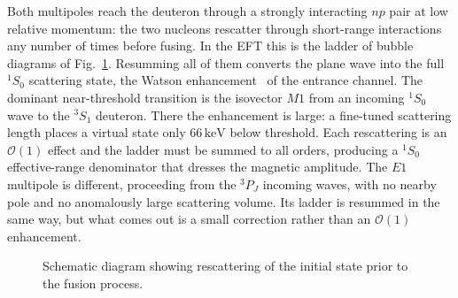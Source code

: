 \documentclass[
  aps,prd,twocolumn,nofootinbib,superscriptaddress,
  longbibliography,floatfix,preprintnumbers
]{revtex4-2}
\newcommand{\dwave}[2]{%
  \draw[thick,double,double distance=1.1pt,decorate,
        decoration={snake,amplitude=1.4pt,segment length=6pt}] (#1)--(#2);%
  \draw[draw=none,midar] (#1)--(#2);%
}
\newcommand{\Mone}{M1}
\newcommand{\Eone}{E1}
\begin{document}
Both multipoles reach the deuteron through a strongly interacting $np$ pair at low relative momentum:
the two nucleons rescatter through short-range interactions any number of times before fusing.
In the EFT this is the ladder of bubble diagrams of Fig.~\ref{fig:bubblechain}.
Resumming all of them converts the plane wave into the full $^{1}S_{0}$ scattering state, the Watson
enhancement~\cite{Watson:1954uc} of the entrance channel.
The dominant near-threshold transition is the isovector $\Mone$ from an incoming $^{1}S_{0}$ wave
to the $^{3}S_{1}$ deuteron. There the enhancement is large: a fine-tuned scattering length places a virtual state only
$66\,\mathrm{keV}$ below threshold. Each rescattering is an $\mathcal{O}(1)$
effect and the ladder must be summed to all orders, producing a $^{1}S_{0}$ effective-range denominator that dresses the magnetic
amplitude.
The $\Eone$ multipole is
different, proceeding from the $^{3}P_{J}$ incoming waves, with no nearby pole and no
anomalously large scattering volume. Its ladder is resummed in the same way, but what
comes out is a small correction rather than an $\mathcal{O}(1)$ enhancement.

\begin{figure}[t]
\centering
{}
\caption{Schematic diagram showing rescattering of the initial state prior to the fusion process.}
\label{fig:bubblechain}
\end{figure}
\end{document}
